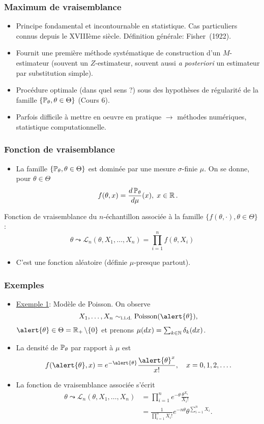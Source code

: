 \begin{frame}
\frametitle{Maximum de vraisemblance}
\begin{itemize}
\item Principe \alert{ fondamental} et
\alert{incontournable} en statistique. Cas particuliers connus
depuis le XVIII\`eme si\`ecle. D\'efinition g\'en\'erale:
Fisher~(1922).
\item Fournit une première \alert{méthode systématique} de construction d'un $M$-estimateur
(souvent un $Z$-estimateur, souvent aussi {\it a posteriori} un
estimateur par substitution simple).
\item Procédure \alert{optimale} (dans quel sens ?)
sous des hypothèses de \alert{ régularité} de la famille
$\{\operatorname{{\mathbb P}}_\theta, \theta \in \Theta\}$ (Cours 6).
\item Parfois difficile à mettre en oeuvre en pratique
$\rightarrow$ \alert{méthodes numériques}, statistique
computationnelle.
\end{itemize}
\end{frame}

\begin{frame}
\frametitle{Fonction de vraisemblance}
\begin{itemize}
\item La famille $\{\operatorname{{\mathbb P}}_\theta,\theta \in \Theta\}$ est dominée par une mesure $\sigma$-finie $\mu$. On se donne, pour $\theta \in \Theta$
$$f(\theta,x) = \frac{d\operatorname{{\mathbb P}}_\theta}{d\mu}(x),\;x \in \operatorname{{\mathbb R}}.$$
\end{itemize}
\begin{df}
\alert{Fonction de vraisemblance} du $n$-échantillon associée à la famille $\{f(\theta,\cdot),\theta \in \Theta\}$ :
$$\boxed{\theta \leadsto {\mathcal L}_n(\theta, X_1,\ldots, X_n) = \prod_{i = 1}^n f(\theta, X_i)}$$
\end{df}
\begin{itemize}
\item C'est une fonction aléatoire (définie $\mu$-presque partout).
\end{itemize}
\end{frame}

\begin{frame}
\frametitle{Exemples}
\begin{itemize}
\item \underline{Exemple 1}: \alert{Modèle de Poisson}. On observe
$$X_1,\ldots, X_n \sim_{\text{i.i.d.}}\text{Poisson}(\alert{\theta}),$$
$\alert{\theta} \in \Theta = \R_+\setminus \{0\}$ et prenons
$\mu(dx) = \sum_{k \in \operatorname{{\mathbb N}}}\delta_k(dx)$.
\item La densit\'e de $\operatorname{{\mathbb P}}_\theta$ par rapport \`a $\mu$ est
$$f(\alert{\theta}, x) = e^{-\alert{\theta}}
\frac{\alert{\theta}^x}{x!}, \quad x=0,1,2,\dots.$$
\item La \alert{ fonction de vraisemblance} associée s'écrit
\begin{align*}
\theta \leadsto {\mathcal L}_n(\theta, X_1,\ldots, X_n)
&= \prod_{i = 1}^n e^{-\theta}\frac{\theta^{X_i}}{X_i!} \\
&= \frac{1}{\prod_{i = 1}^nX_i!} e^{-n\theta} \theta^{\sum_{i = 1}^n X_i}.
\end{align*}
\end{itemize}
\end{frame}

